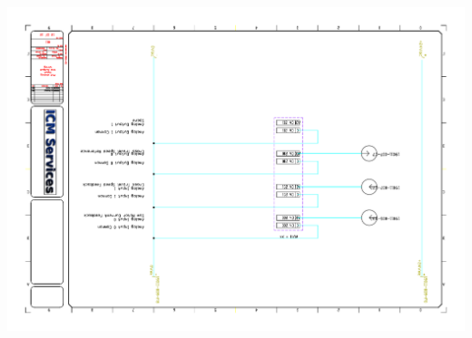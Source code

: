 \begin{center}
	\includegraphics[width=7.5in,angle=90]{../DRAWINGS/19011-011.pdf}
	\label{schem:011} %
\end{center}